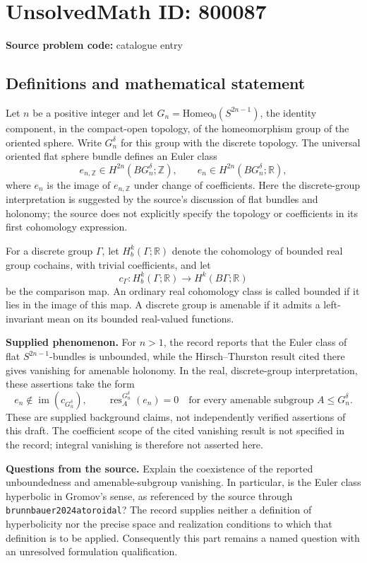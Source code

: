 \documentclass[11pt]{article}
\begin{document}
\section*{UnsolvedMath ID: 800087}
\textbf{Source problem code:} catalogue entry
\subsection{Definitions and mathematical statement}
Let \(n\) be a positive integer and let \(G_n=\mathrm{Homeo}_0(S^{2n-1})\), the identity component, in the compact-open topology, of the homeomorphism group of the oriented sphere. Write \(G_n^\delta\) for this group with the discrete topology. The universal oriented flat sphere bundle defines an Euler class
\[
e_{n,\mathbb Z}\in H^{2n}(BG_n^\delta;\mathbb Z),
\qquad e_n\in H^{2n}(BG_n^\delta;\mathbb R),
\]
where \(e_n\) is the image of \(e_{n,\mathbb Z}\) under change of coefficients. Here the discrete-group interpretation is suggested by the source's discussion of flat bundles and holonomy; the source does not explicitly specify the topology or coefficients in its first cohomology expression.

For a discrete group \(\Gamma\), let \(H_b^k(\Gamma;\mathbb R)\) denote the cohomology of bounded real group cochains, with trivial coefficients, and let
\[
c_\Gamma:H_b^k(\Gamma;\mathbb R)\longrightarrow H^k(B\Gamma;\mathbb R)
\]
be the comparison map. An ordinary real cohomology class is called bounded if it lies in the image of this map. A discrete group is amenable if it admits a left-invariant mean on its bounded real-valued functions.

\textbf{Supplied phenomenon.} For \(n>1\), the record reports that the Euler class of flat \(S^{2n-1}\)-bundles is unbounded, while the Hirsch--Thurston result cited there gives vanishing for amenable holonomy. In the real, discrete-group interpretation, these assertions take the form
\[
e_n\notin\operatorname{im}(c_{G_n^\delta}),
\qquad
\operatorname{res}^{G_n^\delta}_{A}(e_n)=0
\quad\text{for every amenable subgroup }A\leq G_n^\delta.
\]
These are supplied background claims, not independently verified assertions of this draft. The coefficient scope of the cited vanishing result is not specified in the record; integral vanishing is therefore not asserted here.

\textbf{Questions from the source.} Explain the coexistence of the reported unboundedness and amenable-subgroup vanishing. In particular, is the Euler class hyperbolic in Gromov's sense, as referenced by the source through \texttt{brunnbauer2024atoroidal}? The record supplies neither a definition of hyperbolicity nor the precise space and realization conditions to which that definition is to be applied. Consequently this part remains a named question with an unresolved formulation qualification.
\end{document}

